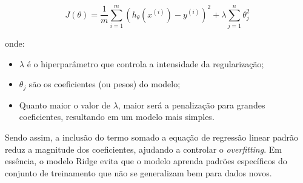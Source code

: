 \begin{equation}
    J(\theta) = \frac{1}{m}\sum_{i=1}^{m}\left(h_{\theta}(x^{(i)})- y^{(i)}\right)^2 + \lambda\sum_{j=1}^{n}\theta^{2}_{j}
\end{equation}

onde:

\begin{itemize}
    \item $\lambda$ é o hiperparâmetro que controla a intensidade da regularização;
    \item $\theta_{j}$ são os coeficientes (ou pesos) do modelo;
    \item Quanto maior o valor de $\lambda$, maior será a penalização para grandes coeficientes, resultando em um modelo mais simples.
\end{itemize}

Sendo assim, a inclusão do termo somado a equação de regressão linear padrão reduz a magnitude dos coeficientes, ajudando a controlar o \textit{overfitting}. Em essência, o modelo Ridge evita que o modelo aprenda padrões específicos do conjunto de treinamento que não se generalizam bem para dados novos.




